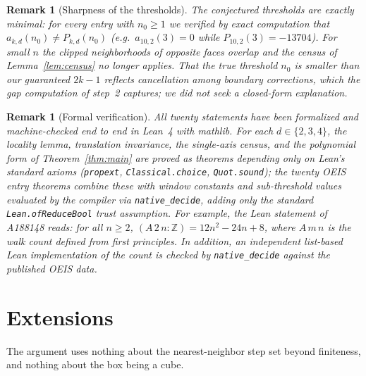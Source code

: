 \documentclass[11pt]{article}
\newtheorem{remark}[theorem]{Remark}
\begin{document}
\begin{remark}[Sharpness of the thresholds]
The conjectured thresholds are exactly minimal: for every entry with
$n_0 \ge 1$ we verified by exact computation that $a_{k,d}(n_0) \ne
P_{k,d}(n_0)$ (e.g.\ $a_{10,2}(3) = 0$ while $P_{10,2}(3) = -13704$).
For small $n$ the clipped neighborhoods of opposite faces overlap and the
census of Lemma~\ref{lem:census} no longer applies.  That the true
threshold $n_0$ is smaller than our guaranteed $2k-1$ reflects
cancellation among boundary corrections, which the gap computation of
step~2 captures; we did not seek a closed-form explanation.
\end{remark}

\begin{remark}[Formal verification]\label{rem:lean}
All twenty statements have been formalized and machine-checked end to
end in Lean~4 with mathlib.  For each $d \in \{2,3,4\}$, the locality
lemma, translation invariance, the single-axis census, and the
polynomial form of Theorem~\ref{thm:main} are proved as theorems
depending only on Lean's standard axioms (\texttt{propext},
\texttt{Classical.choice}, \texttt{Quot.sound}); the twenty OEIS entry
theorems combine these with window constants and sub-threshold values
evaluated by the compiler via \texttt{native\_decide}, adding only the
standard \texttt{Lean.ofReduceBool} trust assumption.  For example, the
Lean statement of A188148 reads: for all $n \ge 2$,
$(A\,2\,n : \mathbb{Z}) = 12n^2 - 24n + 8$, where $A\,m\,n$ is the
walk count defined from first principles.  In addition, an independent
list-based Lean implementation of the count is checked by
\texttt{native\_decide} against the published OEIS data.
\end{remark}

\section{Extensions}\label{sec:extensions}

The argument uses nothing about the nearest-neighbor step set beyond
finiteness, and nothing about the box being a cube.
\end{document}
